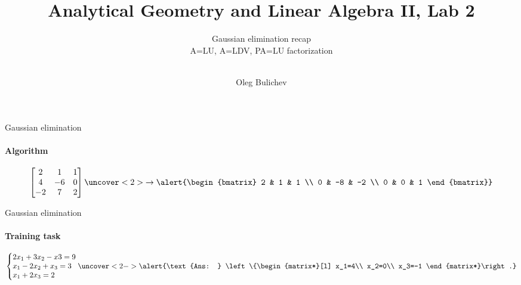 \documentclass[aspectratio=169]{beamer}
\title[AGLA2]{Analytical Geometry and Linear Algebra II, Lab 2} %
\subtitle{Gaussian elimination recap\\
          A=LU, A=LDV, PA=LU factorization \\ \ } %
\author{Oleg Bulichev}
\newcommand{\fbckg}[1]{\usebackgroundtemplate{\texttt{[image: \#1]}}}%
\begin{document}
\fbckg{fibeamer/figs/title_page.png}

\fbckg{fibeamer/figs/common.png}




\begin{frame}[t]{Gaussian elimination}
    \framesubtitle{Algorithm}
    \Large
    \begin{equation*}
        \begin{bmatrix}
            2  & 1  & 1 \\
            4  & -6 & 0 \\
            -2 & 7  & 2
        \end{bmatrix}
        \uncover<2>{\rightarrow \alert{\begin{bmatrix}
                    2 & 1  & 1  \\
                    0 & -8 & -2 \\
                    0 & 0  & 1
                \end{bmatrix}}}
    \end{equation*}
\end{frame}

\begin{frame}[t]{Gaussian elimination}
    \framesubtitle{Training task}
    \begin{equation*}
        \left\{\begin{matrix*}[l]
            2x_1+3x_2-x3=9\\
            x_1-2x_2+x_3=3\\
            x_1+2x_3=2
        \end{matrix*}\right.
        \uncover<2->{\alert{\text{Ans: } \left\{\begin{matrix*}[l]
                    x_1=4\\
                    x_2=0\\
                    x_3=-1
                \end{matrix*}\right.}}
    \end{equation*}
\end{frame}
\end{document}
